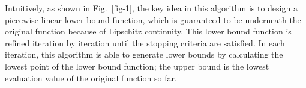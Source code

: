 Intuitively, as shown in Fig.~\ref{fig-1}, the key idea in this algorithm is to design a piecewise-linear lower bound function, which is guaranteed to be underneath the original function because of Lipschitz continuity. This lower bound function is refined iteration by iteration until the stopping criteria are satisfied. In each iteration, this algorithm is able to generate lower bounds by calculating the lowest point of the lower bound function; the upper bound is the lowest evaluation value of the original function so far. 


	

